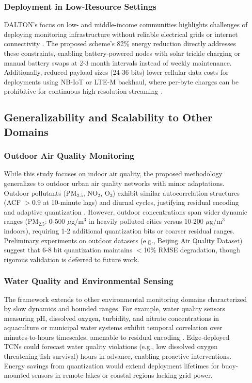 \subsubsection{Deployment in Low-Resource Settings}

DALTON's focus on low- and middle-income communities highlights challenges of deploying monitoring infrastructure without reliable electrical grids or internet connectivity \cite{karmakar2024exploring}. The proposed scheme's 82\% energy reduction directly addresses these constraints, enabling battery-powered nodes with solar trickle charging or manual battery swaps at 2-3 month intervals instead of weekly maintenance. Additionally, reduced payload sizes (24-36 bits) lower cellular data costs for deployments using NB-IoT or LTE-M backhaul, where per-byte charges can be prohibitive for continuous high-resolution streaming \cite{zaid2025investigating}.

\subsection{Generalizability and Scalability to Other Domains}

\subsubsection{Outdoor Air Quality Monitoring}

While this study focuses on indoor air quality, the proposed methodology generalizes to outdoor urban air quality networks with minor adaptations. Outdoor pollutants (PM$_{2.5}$, NO$_2$, O$_3$) exhibit similar autocorrelation structures (ACF $> 0.9$ at 10-minute lags) and diurnal cycles, justifying residual encoding and adaptive quantization \cite{yildiz2025development}. However, outdoor concentrations span wider dynamic ranges (PM$_{2.5}$: 0-500 $\mu$g/m$^3$ in heavily polluted cities versus 10-200 $\mu$g/m$^3$ indoors), requiring 1-2 additional quantization bits or coarser residual ranges. Preliminary experiments on outdoor datasets (e.g., Beijing Air Quality Dataset) suggest that 6-8 bit quantization maintains $<$10\% RMSE degradation, though rigorous validation is deferred to future work.

\subsubsection{Water Quality and Environmental Sensing}

The framework extends to other environmental monitoring domains characterized by slow dynamics and bounded ranges. For example, water quality sensors measuring pH, dissolved oxygen, turbidity, and nitrate concentrations in aquaculture or municipal water systems exhibit temporal correlation over minutes-to-hours timescales, amenable to residual encoding \cite{rojek2026impact}. Edge-deployed TCNs could forecast water quality violations (e.g., low dissolved oxygen threatening fish survival) hours in advance, enabling proactive interventions. Energy savings from quantization would extend deployment lifetimes for buoy-mounted sensors in remote lakes or coastal regions lacking grid power.

